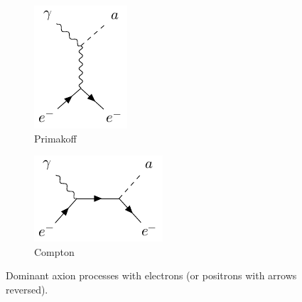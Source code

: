 \begin{figure}[h]
	\centering
	\begin{subfigure}[]{0.4\textwidth}
		\centering
		\includegraphics{diagrams/primakoff-process.pdf}
		\caption{Primakoff}
		\label{fig:Primakoff-scattering}
	\end{subfigure}
	\begin{subfigure}[]{0.4\textwidth}
		\centering
		\includegraphics{diagrams/compton-process.pdf}
		\caption{Compton}
		\label{fig:Compton-scattering}
	\end{subfigure}
	\caption{Dominant axion processes with electrons (or positrons with arrows reversed).}
	\label{fig:scattering-processes}
\end{figure}


